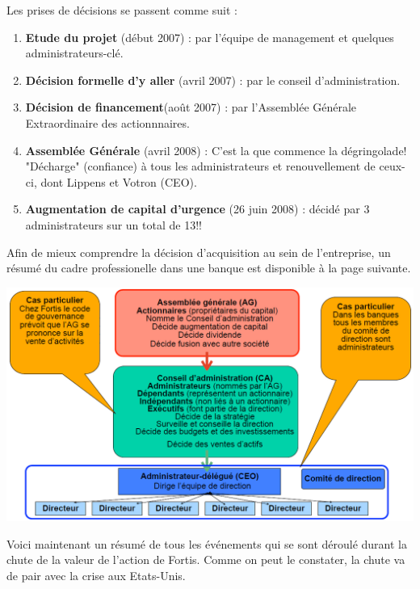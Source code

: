 Les prises de décisions se passent comme suit : 
\begin{enumerate}
\item \textbf{Etude du projet} (début 2007) : par l'équipe de management et quelques administrateurs-clé. 

\item \textbf{Décision formelle d'y aller} (avril 2007) : par le conseil d'administration. 

\item \textbf{Décision de financement}(août 2007) : par l'Assemblée Générale Extraordinaire des actionnnaires.

\item \textbf{Assemblée Générale} (avril 2008) : C'est la que commence la dégringolade! "Décharge" (confiance) à tous les administrateurs et renouvellement de ceux-ci, dont Lippens et Votron (CEO).  

\item \textbf{Augmentation de capital d'urgence} (26 juin 2008) : décidé par 3 administrateurs sur un total de 13!!
\end{enumerate}

Afin de mieux comprendre la décision d'acquisition au sein de l'entreprise, un résumé du cadre professionelle dans une banque est disponible à la page suivante. 

\begin{center}
\includegraphics[scale=0.4]{12}
\end{center}

Voici maintenant un résumé de tous les événements qui se sont déroulé durant la chute de la valeur de l'action de Fortis. Comme on peut le constater, la chute va de pair avec la crise aux Etats-Unis. 

